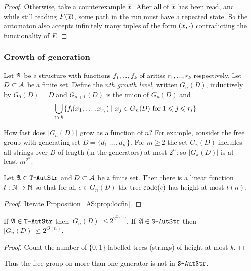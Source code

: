 \begin{proof}
Otherwise, take a counterexample  $\mbox{$\overline {x}$}$.
After all of $\mbox{$\overline {x}$}$ has been read, and while still reading $F(\mbox{$\overline {x}$})$, some path in the run must have a repeated state. 
So the automaton also accepts infinitely many tuples of the form $(\mbox{$\overline {x}$}, \cdot)$ contradicting the functionality of $F$.
\end{proof}

\subsubsection*{Growth of generation}

\begin{definition} \label{dfn:growth} \cite{KhNe95}
Let $\mathfrak{A}$ be a structure with functions $f_1, \dots, f_k$ of arities $r_1, \dots, r_k$ respectively. 
Let $D \subset {\mathcal A}$ be a finite set.
Define the
{\em $n$th growth level}, written $G_n(D)$, inductively by $G_0(D) = D$
and $G_{n+1}(D)$ is the union of $G_n(D)$ and
\[
\bigcup_{i\leqslant k} \{f_i(x_1,\dots,x_{r_i}) \ \vert \  x_j \in G_n(D) \text{ for } 1 \leqslant j \leqslant r_i\}.
\]
\end{definition}

How fast does $|G_n(D)|$ grow as a function of $n$?  For
example, consider the free group with generating
set $D = \{d_1, \dots, d_m\}$. For $m \geq 2$ the set $G_n(D)$ includes all strings over $D$ of length (in the generators)
at most $2^n$; so  $|G_n(D)|$ is at least $m^{2^{n}}$.

\begin{proposition} \cite{KhNe95} 
 \label{AS:prop:growth}
Let $\mathfrak{A} \in \mbox{\tt T-AutStr}$ and $D \subset {\mathcal A}$ be a finite set. Then there is a
linear function $t:\mathbb{N} \rightarrow \mathbb{N}$ so that for all $e \in G_n(D)$ the tree ${\rm code}({e})$ has
height at most $t(n)$.
\end{proposition}
\begin{proof}
 Iterate Proposition~\ref{AS:prop:locfin}.
\end{proof}

\begin{corollary} 
If $\mathfrak{A} \in \mbox{\tt T-AutStr}$ then $|G_n(D)| \leq 2^{2^{O(n)}}$. If $\mathfrak{A} \in \mbox{\tt S-AutStr}$ then 
$|G_n(D)| \leq 2^{O(n)}$.
\end{corollary}
\begin{proof}
Count the number of $\{0,1\}$-labelled trees (strings) of height at most $k$.
\end{proof}

Thus the free group on more than one generator is not in $\mbox{\tt S-AutStr}$.

